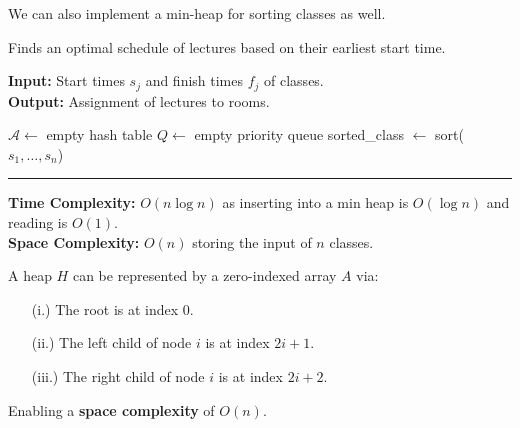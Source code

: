 \noindent
We can also implement a min-heap for sorting classes as well. 
\newpage
\begin{Func}[EarliestStartTimeFirst Algorithm - \texttt{EST($j = 1 \dots n : s_j, f_j$)}]
    Finds an optimal schedule of lectures based on their earliest start time.

    \vspace{.5em}
    \noindent
    \textbf{Input:} Start times $s_j$ and finish times $f_j$ of classes.\\
    \textbf{Output:} Assignment of lectures to rooms.\\
    \begin{algorithm}[H]
        \SetAlgoLined
        $\mathcal{A} \gets$ empty hash table 
        $Q \gets$ empty priority queue 
        sorted\_class $\gets$ sort($s_1, \dots, s_n$) 
        
    \end{algorithm}

    \vspace{1em}
    \noindent\rule{\textwidth}{0.4pt}

    \noindent
    \textbf{Time Complexity:} $O(n\log n)$ as inserting into a min heap is $O(\log n)$ and reading is $O(1)$.\\
    \textbf{Space Complexity:} $O(n)$ storing the input of $n$ classes.
\end{Func}

\begin{theo}

    A heap $H$ can be represented by a zero-indexed array $A$ via:
    \begin{itemize}
        \item[(i.)] The root is at index $0$.
        \item[(ii.)] The left child of node $i$ is at index $2i + 1$.
        \item[(iii.)] The right child of node $i$ is at index $2i + 2$.
    \end{itemize}

    \noindent
    Enabling a \textbf{space complexity} of $O(n)$.
\end{theo}
\newpage


